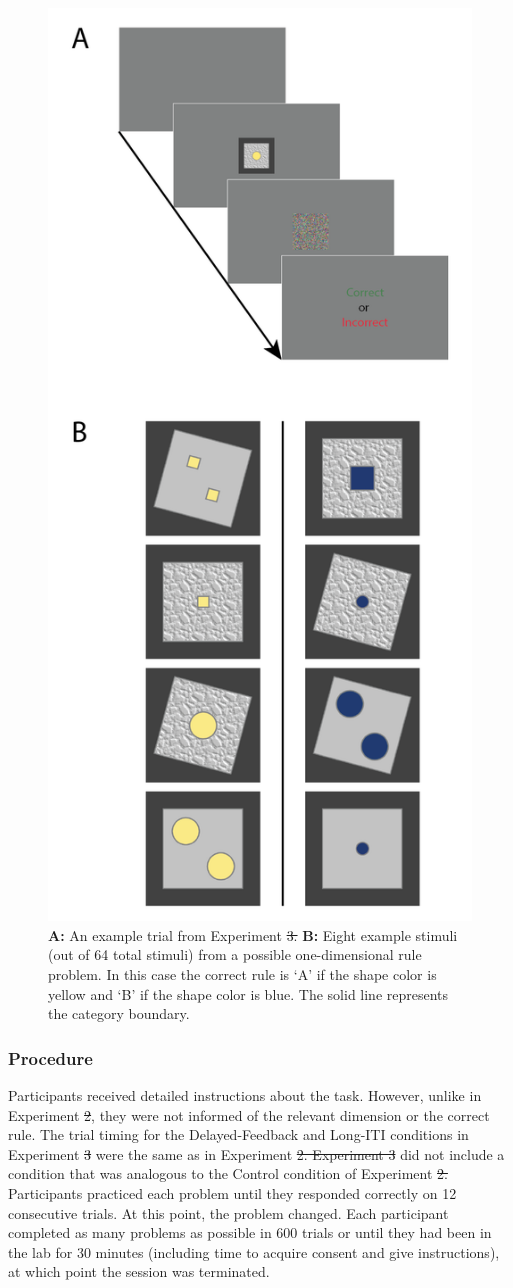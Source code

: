 \documentclass[doc, floatsintext]{apa7}
\providecommand{\DIFadd}[1]{{\protect\color{blue}\uwave{#1}}} %
\providecommand{\DIFdel}[1]{{\protect\color{red}\sout{#1}}}                      %
\providecommand{\DIFaddbegin}{} %
\providecommand{\DIFaddend}{} %
\providecommand{\DIFdelbegin}{} %
\providecommand{\DIFdelend}{} %
\providecommand{\DIFaddFL}[1]{\DIFadd{#1}} %
\providecommand{\DIFdelFL}[1]{\DIFdel{#1}} %
\providecommand{\DIFaddbeginFL}{} %
\providecommand{\DIFaddendFL}{} %
\providecommand{\DIFdelbeginFL}{} %
\providecommand{\DIFdelendFL}{} %
\newcommand{\DIFscaledelfig}{0.5}
\newlength{\DIFdelgraphicswidth} %
\newlength{\DIFdelgraphicsheight} %
\newcommand{\DIFaddincludegraphics}[2][]{{\color{blue}\fbox{\DIFOincludegraphics[#1]{#2}}}} %
\newcommand{\DIFdelincludegraphics}[2][]{%
\sbox{\DIFdelgraphicsbox}{\DIFOincludegraphics[#1]{#2}}%
\settoboxwidth{\DIFdelgraphicswidth}{\DIFdelgraphicsbox} %
\settoboxtotalheight{\DIFdelgraphicsheight}{\DIFdelgraphicsbox} %
\scalebox{\DIFscaledelfig}{%
\parbox[b]{\DIFdelgraphicswidth}{\usebox{\DIFdelgraphicsbox}\\[-\baselineskip] \rule{\DIFdelgraphicswidth}{0em}}\llap{\resizebox{\DIFdelgraphicswidth}{\DIFdelgraphicsheight}{%
\setlength{\unitlength}{\DIFdelgraphicswidth}%
\begin{picture}(1,1)%
\thicklines\linethickness{2pt} %
{\color[rgb]{1,0,0}\put(0,0){\framebox(1,1){}}}%
{\color[rgb]{1,0,0}\put(0,0){\line( 1,1){1}}}%
{\color[rgb]{1,0,0}\put(0,1){\line(1,-1){1}}}%
\end{picture}%
}\hspace*{3pt}}} %
} %
\DeclareRobustCommand{\DIFaddbegin}{\DIFOaddbegin \let\includegraphics\DIFaddincludegraphics} %
\DeclareRobustCommand{\DIFaddend}{\DIFOaddend \let\includegraphics\DIFOincludegraphics} %
\DeclareRobustCommand{\DIFdelbegin}{\DIFOdelbegin \let\includegraphics\DIFdelincludegraphics} %
\DeclareRobustCommand{\DIFdelend}{\DIFOaddend \let\includegraphics\DIFOincludegraphics} %
\DeclareRobustCommand{\DIFaddbeginFL}{\DIFOaddbeginFL \let\includegraphics\DIFaddincludegraphics} %
\DeclareRobustCommand{\DIFaddendFL}{\DIFOaddendFL \let\includegraphics\DIFOincludegraphics} %
\DeclareRobustCommand{\DIFdelbeginFL}{\DIFOdelbeginFL \let\includegraphics\DIFdelincludegraphics} %
\DeclareRobustCommand{\DIFdelendFL}{\DIFOaddendFL \let\includegraphics\DIFOincludegraphics} %
\begin{document}
\begin{figure}
  \centering
  \includegraphics[width=.5\textwidth]{../figures/fig_design_exp_2.png}
  \caption{
      \textbf{A:} An example trial from Experiment \DIFdelbeginFL \DIFdelFL{3.
      }\DIFdelendFL \DIFaddbeginFL \DIFaddFL{2.
      }\DIFaddendFL \textbf{B:} Eight example stimuli (out of 64 total
      stimuli) from a possible one-dimensional rule problem.
      In this case the correct rule is `A' if the shape
      color is yellow and `B' if the shape color is blue.
      The solid line represents the category boundary.
}
  \label{fig_design_exp_2}
\end{figure}

\subsubsection{Procedure}
Participants received detailed instructions about the task.
However, unlike in Experiment \DIFdelbegin \DIFdel{2}\DIFdelend \DIFaddbegin \DIFadd{1}\DIFaddend , they were not informed of
the relevant dimension or the correct rule. The trial timing
for the Delayed-Feedback and Long-ITI conditions in
Experiment \DIFdelbegin \DIFdel{3 }\DIFdelend \DIFaddbegin \DIFadd{2 }\DIFaddend were the same as in Experiment \DIFdelbegin \DIFdel{2. Experiment 3
}\DIFdelend \DIFaddbegin \DIFadd{1. Experiment 2
}\DIFaddend did not include a condition that was analogous to the
Control condition of Experiment \DIFdelbegin \DIFdel{2. }\DIFdelend \DIFaddbegin \DIFadd{1. }\DIFaddend Participants practiced
each problem until they responded correctly on 12
consecutive trials. At this point, the problem changed. Each
participant completed as many problems as possible in 600
trials or until they had been in the lab for 30 minutes
(including time to acquire consent and give instructions),
at which point the session was terminated.
\end{document}
